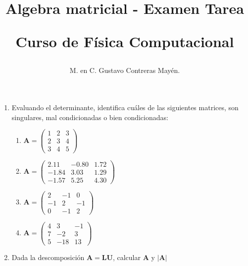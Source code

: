 \documentclass[12pt]{article}
\author{M. en C. Gustavo Contreras Mayén.}
\title{Algebra matricial - Examen Tarea \\ \begin{Large}Curso de Fí­sica Computacional\end{Large}}
\date{ }
\numberwithin{equation}{section}
\begin{document}
\maketitle
\begin{enumerate}
\item Evaluando el determinante, identifica cuáles de las siguientes matrices, son singulares, mal condicionadas o bien condicionadas:
\begin{multicols}{2}
	\begin{enumerate}
		\item $ \mathbf{A} =
				\begin{pmatrix}
					1 & 2 & 3 \\
					2 & 3 & 4 \\
					3 & 4 & 5
				\end{pmatrix} $
		\item $ \mathbf{A} =
				\begin{pmatrix}
					2.11 & -0.80 & 1.72 \\
					-1.84 & 3.03 & 1.29 \\
					-1.57 & 5.25 & 4.30
				\end{pmatrix} $
		\item $ \mathbf{A} =
				\begin{pmatrix}
					2 & -1 & 0 \\
					-1 & 2 & -1 \\
					0 & -1 & 2
				\end{pmatrix} $
		\item $ \mathbf{A} =
				\begin{pmatrix}
					4 & 3 & -1 \\
					7 & -2 & 3 \\
					5 & -18 & 13
				\end{pmatrix} $ 
	\end{enumerate}
\end{multicols}
\item Dada la descomposición $\mathbf{A} = \mathbf{LU}$, calcular $\mathbf{A}$ y $\vert \mathbf{A} \vert$
\end{enumerate}
\end{document}
